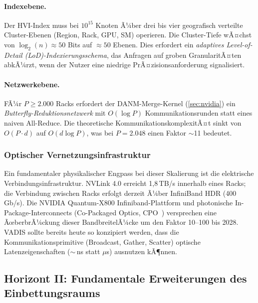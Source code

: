 ﻿\documentclass[12pt,a4paper]{article}
\begin{document}
\paragraph{Indexebene.}
Der HVI-Index muss bei $10^{15}$ Knoten Ã¼ber drei bis vier
geografisch verteilte Cluster-Ebenen (Region, Rack, GPU, SM)
operieren. Die Cluster-Tiefe wÃ¤chst von $\log_2(n) \approx 50$
Bits auf $\approx 50$ Ebenen. Dies erfordert ein
\emph{adaptives Level-of-Detail (LoD)-Indexierungsschema},
das Anfragen auf groben GranularitÃ¤ten abkÃ¼rzt, wenn der
Nutzer eine niedrige PrÃ¤zisionsanforderung signalisiert.

\paragraph{Netzwerkebene.}
FÃ¼r $P \geq 2.000$ Racks erfordert der DANM-Merge-Kernel
(\cref{sec:nvidia}) ein \emph{Butterfly-Reduktionsnetzwerk}
mit $O(\log P)$ Kommunikationsrunden statt eines
naiven All-Reduce. Die theoretische KommunikationskomplexitÃ¤t
sinkt von $O(P \cdot d)$ auf $O(d \log P)$, was bei
$P = 2.048$ einen Faktor $\sim$11 bedeutet.

\subsubsection{Optischer Vernetzungsinfrastruktur}

Ein fundamentaler physikalischer Engpass bei dieser
Skalierung ist die elektrische Verbin\-dungsinfrastruktur.
NVLink 4.0 erreicht 1,8\,TB/s innerhalb eines Racks;
die Verbindung zwischen Racks erfolgt derzeit Ã¼ber
InfiniBand HDR (400\,Gb/s). Die NVIDIA Quantum-X800
Infiniband-Plattform und photonische In-Package-Interconnects
(Co-Packaged Optics, CPO~\cite{thraskias2018survey}) versprechen
eine ÃœberbrÃ¼ckung dieser BandbreitelÃ¼cke um den Faktor 10--100
bis 2028. VADIS sollte bereits heute so konzipiert werden, dass
die Kommunikationsprimitive (Broadcast, Gather, Scatter)
optische Latenzeigenschaften ($\sim$\,ns statt $\mu$s) ausnutzen
kÃ¶nnen.

\subsection{Horizont II: Fundamentale Erweiterungen des
            Einbettungsraums}
\label{sub:horizont2}
\end{document}

